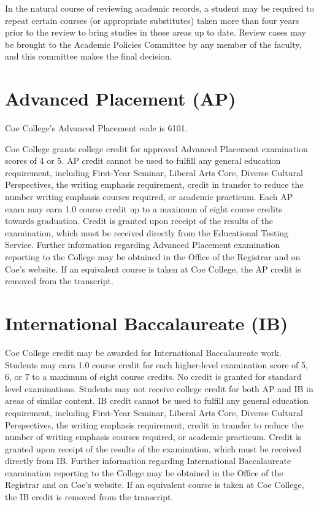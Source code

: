 \documentclass[
  letterpaper,
]{scrbook}
\begin{document}
In the natural course of reviewing academic records, a student may be
required to repeat certain courses (or appropriate substitutes) taken
more than four years prior to the review to bring studies in those areas
up to date. Review cases may be brought to the Academic Policies
Committee by any member of the faculty, and this committee makes the
final decision.

\section{Advanced Placement (AP)}\label{advanced-placement-ap}

Coe College's Advanced Placement code is 6101.

Coe College grants college credit for approved Advanced Placement
examination scores of 4 or 5. AP credit cannot be used to fulfill any
general education requirement, including First-Year Seminar, Liberal
Arts Core, Diverse Cultural Perspectives, the writing emphasis
requirement, credit in transfer to reduce the number writing emphasis
courses required, or academic practicum. Each AP exam may earn 1.0
course credit up to a maximum of eight course credits towards
graduation. Credit is granted upon receipt of the results of the
examination, which must be received directly from the Educational
Testing Service. Further information regarding Advanced Placement
examination reporting to the College may be obtained in the Office of
the Registrar and on Coe's website. If an equivalent course is taken at
Coe College, the AP credit is removed from the transcript.

\section{International Baccalaureate
(IB)}\label{international-baccalaureate-ib}

Coe College credit may be awarded for International Baccalaureate work.
Students may earn 1.0 course credit for each higher-level examination
score of 5, 6, or 7 to a maximum of eight course credits. No credit is
granted for standard level examinations. Students may not receive
college credit for both AP and IB in areas of similar content. IB credit
cannot be used to fulfill any general education requirement, including
First-Year Seminar, Liberal Arts Core, Diverse Cultural Perspectives,
the writing emphasis requirement, credit in transfer to reduce the
number of writing emphasis courses required, or academic practicum.
Credit is granted upon receipt of the results of the examination, which
must be received directly from IB. Further information regarding
International Baccalaureate examination reporting to the College may be
obtained in the Office of the Registrar and on Coe's website. If an
equivalent course is taken at Coe College, the IB credit is removed from
the transcript.
\end{document}
